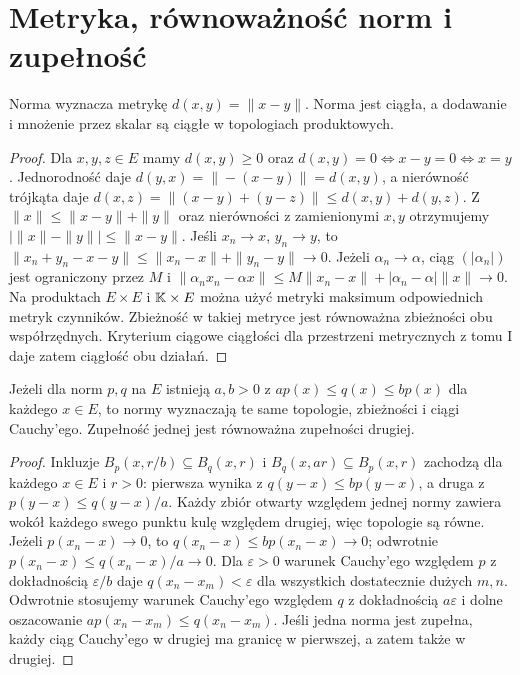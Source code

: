 \section{Metryka, równoważność norm i zupełność}
\begin{twierdzenie}
\label{ma2:thm:metric}
Norma wyznacza metrykę $d(x,y)=\|x-y\|$. Norma jest ciągła,
a dodawanie i mnożenie przez skalar są ciągłe w topologiach
produktowych.
\end{twierdzenie}
\begin{proof}
Dla $x,y,z\in E$ mamy $d(x,y)\ge0$ oraz
$d(x,y)=0\iff x-y=0\iff x=y$. Jednorodność daje
$d(y,x)=\|-(x-y)\|=d(x,y)$, a nierówność trójkąta daje
$d(x,z)=\|(x-y)+(y-z)\|\le d(x,y)+d(y,z)$.
Z $\|x\|\le\|x-y\|+\|y\|$ oraz nierówności z zamienionymi
$x,y$ otrzymujemy $|\|x\|-\|y\||\le\|x-y\|$.
Jeśli $x_n\to x$, $y_n\to y$, to
$\|x_n+y_n-x-y\|\le\|x_n-x\|+\|y_n-y\|\to0$.
Jeżeli $\alpha_n\to\alpha$, ciąg $(|\alpha_n|)$ jest
ograniczony przez $M$ i
$\|\alpha_n x_n-\alpha x\|\le M\|x_n-x\|+|\alpha_n-\alpha|\|x\|\to0$.
Na produktach $E\times E$ i $\mathbb K\times E$ można użyć metryki
maksimum odpowiednich metryk czynników. Zbieżność w takiej
metryce jest równoważna zbieżności obu współrzędnych.
Kryterium ciągowe ciągłości dla przestrzeni metrycznych
z tomu I daje zatem ciągłość obu działań.
\end{proof}
\begin{twierdzenie}
\label{ma2:thm:equiv}
Jeżeli dla norm $p,q$ na $E$ istnieją $a,b>0$ z
$a p(x)\le q(x)\le b p(x)$ dla każdego $x\in E$, to normy
wyznaczają te same topologie, zbieżności i ciągi Cauchy'ego.
Zupełność jednej jest równoważna zupełności drugiej.
\end{twierdzenie}
\begin{proof}
Inkluzje $B_p(x,r/b)\subseteq B_q(x,r)$ i
$B_q(x,ar)\subseteq B_p(x,r)$ zachodzą dla każdego $x\in E$
i $r>0$: pierwsza wynika z $q(y-x)\le bp(y-x)$, a druga
z $p(y-x)\le q(y-x)/a$. Każdy zbiór otwarty względem jednej
normy zawiera wokół każdego swego punktu kulę względem drugiej,
więc topologie są równe.
Jeżeli $p(x_n-x)\to0$, to $q(x_n-x)\le bp(x_n-x)\to0$;
odwrotnie $p(x_n-x)\le q(x_n-x)/a\to0$.
Dla $\varepsilon>0$ warunek Cauchy'ego względem $p$ z
dokładnością $\varepsilon/b$ daje $q(x_n-x_m)<\varepsilon$
dla wszystkich dostatecznie dużych $m,n$. Odwrotnie stosujemy
warunek Cauchy'ego względem $q$ z dokładnością $a\varepsilon$
i dolne oszacowanie $ap(x_n-x_m)\le q(x_n-x_m)$. Jeśli jedna norma jest zupełna,
każdy ciąg Cauchy'ego w drugiej ma granicę w pierwszej,
a zatem także w drugiej.
\end{proof}
